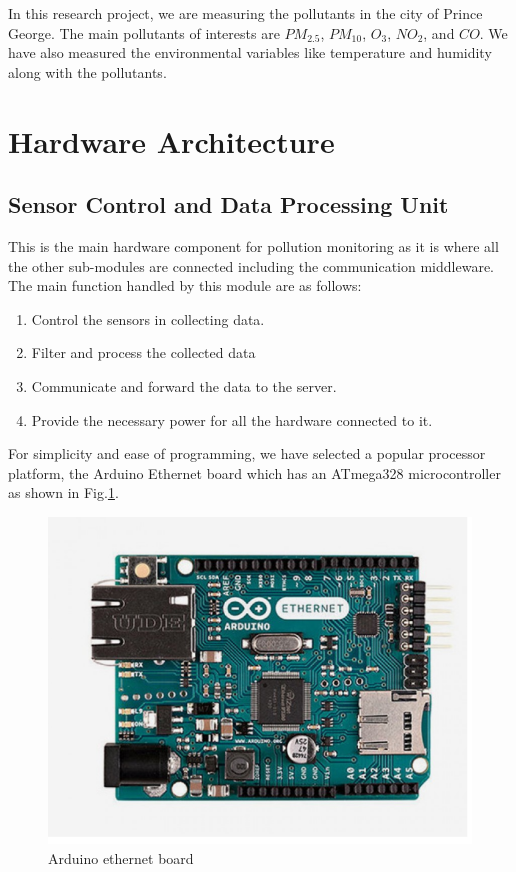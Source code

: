     In this research project, we are measuring the pollutants in the city of Prince George. The main pollutants of interests are  $PM_{2.5}$, $PM_{10}$, $O_3$, $NO_2$, and $CO$. We have also measured the environmental variables like temperature and humidity along with the pollutants. 

 \section{Hardware Architecture}
  
\subsection{Sensor Control and Data Processing Unit}

This is the main hardware component for pollution monitoring as it is where all the other sub-modules are connected including the communication middleware. The main function handled by this module are as follows:

\begin{enumerate}

\item Control the sensors in collecting data.
\item Filter and process the collected data 
\item Communicate and forward the data to the server.
\item Provide the necessary power for all the hardware connected to it.

\end{enumerate}
For simplicity and ease of programming, we have selected a popular processor platform, the Arduino Ethernet board which has an ATmega328 microcontroller as shown in Fig.\ref{Arduino}. 

\begin{figure}[h]
  \begin{center}
  \includegraphics[scale=0.70]{./images/figure3.png}
  \end{center}
  \caption{Arduino ethernet board}
  \label{Arduino}
\end{figure}

